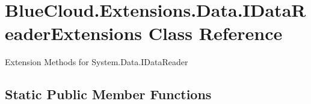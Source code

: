 \hypertarget{class_blue_cloud_1_1_extensions_1_1_data_1_1_i_data_reader_extensions}{}\section{Blue\+Cloud.\+Extensions.\+Data.\+I\+Data\+Reader\+Extensions Class Reference}
\label{class_blue_cloud_1_1_extensions_1_1_data_1_1_i_data_reader_extensions}


Extension Methods for System.\+Data.\+I\+Data\+Reader  


\subsection*{Static Public Member Functions}
